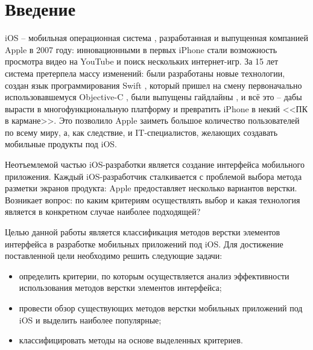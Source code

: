 \chapter*{Введение}

iOS -- мобильная операционная система  \cite{ios}, разработанная и выпущенная компанией Apple \cite{apple} в 2007 году: инновационными в первых iPhone \cite{iphone} стали возможность просмотра видео на YouTube \cite{youtube} и поиск нескольких интернет-игр. За 15 лет система претерпела массу изменений: были разработаны новые технологии, создан язык программирования Swift \cite{swift}, который пришел на смену первоначально использовавшемуся Objective-C \cite{objc}, были выпущены гайдлайны \cite{hig}, и всё это -- дабы вырасти в многофункциональную платформу и превратить iPhone в некий <<ПК в кармане>>. Это позволило Apple заиметь большое количество пользователей по всему миру, а, как следствие, и IT-специалистов, желающих создавать мобильные продукты под iOS. 

Неотъемлемой частью iOS-разработки является создание интерфейса мобильного приложения. Каждый iOS-разработчик сталкивается с проблемой выбора метода разметки экранов продукта: Apple предоставляет несколько вариантов верстки. Возникает вопрос: по каким критериям осуществлять выбор и какая технология является в конкретном случае наиболее подходящей?

Целью данной работы является классификация методов верстки элементов интерфейса в разработке мобильных приложений под iOS. Для достижение поставленной цели необходимо решить следующие задачи: 

\begin{itemize}
	\item определить критерии, по которым осуществляется анализ эффективности использования методов верстки элементов интерфейса;
	\item провести обзор существующих методов верстки мобильных приложений под iOS и выделить наиболее популярные;
	\item классифицировать методы на основе выделенных критериев.
\end{itemize}
